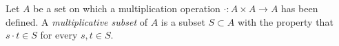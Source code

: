 \documentclass[12pt]{article}
\begin{document}
Let $A$ be a set on which a multiplication operation $\cdot: A \times A \longrightarrow A$ has been defined. A {\em multiplicative subset} of $A$ is a subset $S \subset A$ with the property that $s \cdot t \in S$ for every $s,t \in S$.
\end{document}
